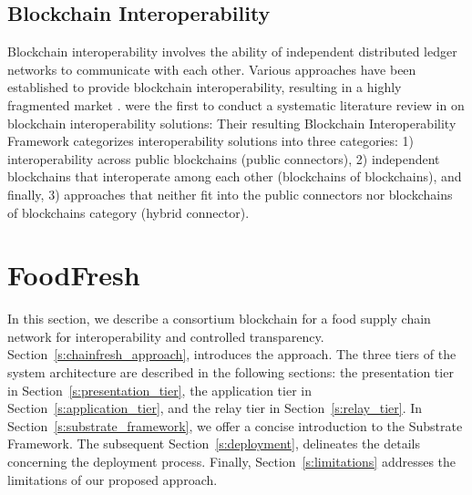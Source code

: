 \documentclass[conference,a4paper,flushend]{neutr}
\begin{document}
\subsection{Blockchain Interoperability} \label{s:blockchain_interoperability}
Blockchain interoperability involves the ability of independent distributed ledger networks to communicate with each other. Various approaches have been established to provide blockchain interoperability, resulting in a highly fragmented market \cite{belchior2021survey}.
\citeauthor{belchior2021survey} were the first to conduct a systematic literature review in \cite{belchior2021survey} on blockchain interoperability solutions:
Their resulting Blockchain Interoperability Framework categorizes interoperability solutions into three categories: 1) interoperability across public blockchains (public connectors),  2) independent blockchains that interoperate among each other (blockchains of blockchains), and finally, 3) approaches that neither fit into the public connectors nor blockchains of blockchains category (hybrid connector). 

\section{FoodFresh} \label{s:chainFresh}
In this section, we describe a consortium blockchain for a food supply chain network for interoperability and controlled transparency. Section~\ref{s:chainfresh_approach}, introduces the approach. The three tiers of the system architecture are described in the following sections: the presentation tier in Section~\ref{s:presentation_tier},  the application tier in Section~\ref{s:application_tier}, and the relay tier in Section~\ref{s:relay_tier}. In Section~\ref{s:substrate_framework}, we offer a concise introduction to the Substrate Framework. The subsequent Section~\ref{s:deployment}, delineates the details concerning the deployment process. Finally, Section~\ref{s:limitations} addresses the limitations of our proposed approach.
\end{document}

